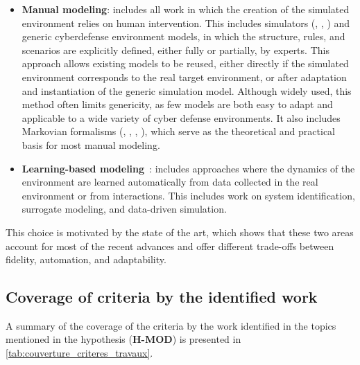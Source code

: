 \begin{itemize}
  \item \textbf{Manual modeling}: includes all work in which the creation of the simulated environment relies on human intervention. This includes simulators (, , ) and generic cyberdefense environment models, in which the structure, rules, and scenarios are explicitly defined, either fully or partially, by experts. This approach allows existing models to be reused, either directly if the simulated environment corresponds to the real target environment, or after adaptation and instantiation of the generic simulation model. Although widely used, this method often limits genericity, as few models are both easy to adapt and applicable to a wide variety of cyber defense environments. It also includes Markovian formalisms (, , , ), which serve as the theoretical and practical basis for most manual modeling.
  \item \textbf{Learning-based modeling}~: includes approaches where the dynamics of the environment are learned automatically from data collected in the real environment or from interactions. This includes work on system identification, surrogate modeling, and data-driven simulation.
\end{itemize}

This choice is motivated by the state of the art, which shows that these two areas account for most of the recent advances and offer different trade-offs between fidelity, automation, and adaptability.

\subsection*{Coverage of criteria by the identified work}

A summary of the coverage of the criteria by the work identified in the topics mentioned in the hypothesis (\textbf{H-MOD}) is presented in \autoref{tab:couverture_criteres_travaux}.

